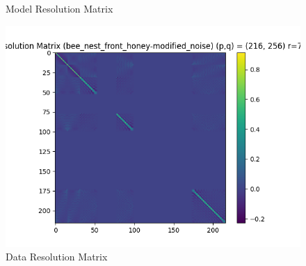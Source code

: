 \documentclass{article}
\begin{document}
\begin{itemize}
\begin{figure}[h]
        \caption{Model Resolution Matrix}
    \end{figure}
    \begin{figure}[h]
        \centering
        \includegraphics[width=1\textwidth]{images/outputs/datares/bee_nest_front_honey-modified_noise.png}
        \caption{Data Resolution Matrix}
    \end{figure}
    \clearpage



\end{itemize}
\end{document}
